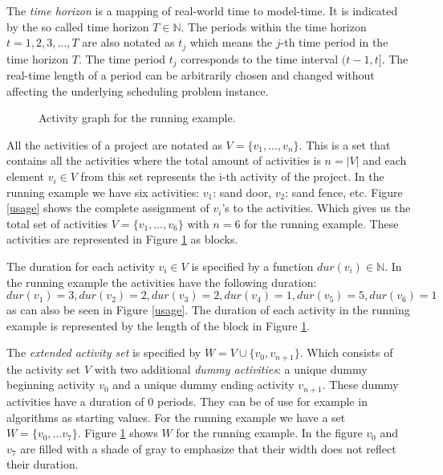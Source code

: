 \documentclass{article}
\theoremstyle{definition}
\newcommand{\inputtikz}[1]{}
\newcommand{\dur}[1]{\ensuremath{dur(v_{#1})}} %
\begin{document}
The \emph{time horizon} is a mapping of real-world time to model-time. It is indicated by the so called time horizon $T \in \mathbb{N}$.
The periods within the time horizon $t=1,2,3,\ldots,T$ are also notated as $t_j$ which means the $j$-th time period in the time horizon $T$. 
The time period $t_j$ corresponds to the time interval $(t-1,t]$. 
The real-time length of a period can be arbitrarily chosen and changed without affecting the underlying scheduling problem instance. 

\begin{figure}[ht]
	\centering
	\inputtikz{activity_graph}
	\caption{Activity graph for the running example.}
	\label{fig:activity_graph}
\end{figure}

All the activities of a project are notated as $V = \{v_1, \ldots, v_n\}$.
This is a set that contains all the activities where the total amount of activities is $n = |V|$ and each element $v_i \in V$ from this set represents the i-th activity of the project.
In the running example we have six activities: $v_1$: sand door, $v_2$: sand fence, etc. Figure \ref{usage} shows the complete assignment of $v_i$'s to the activities. 
Which gives us the total set of activities $V = \{v_1, \ldots, v_6\}$ with $n = 6$ for the running example.
These activities are represented in Figure \ref{fig:activity_graph} as blocks.

The duration for each activity $v_i \in V$ is specified by a function $\dur{i} \in \mathbb{N}$.
In the running example the activities have the following duration: $\dur{1} = 3, \dur{2} = 2, \dur{3} = 2, \dur{4} = 1, \dur{5} = 5, \dur{6} = 1$ as can also be seen in Figure \ref{usage}. 
The duration of each activity in the running example is represented by the length of the block in Figure \ref{fig:activity_graph}.

The \emph{extended activity set} is specified by $W = V \cup \{v_0, v_{n+1}\}$.
Which consists of the activity set $V$ with two additional \emph{dummy activities}: a unique dummy beginning activity $v_0$ and a unique dummy ending activity $v_{n+1}$. 
These dummy activities have a duration of $0$ periods. 
They can be of use for example in algorithms as starting values. 
For the running example we have a set $W = \{v_0, \ldots v_7\}$.
Figure \ref{fig:activity_graph} shows $W$ for the running example.
In the figure $v_0$ and $v_7$ are filled with a shade of gray to emphasize that their width does not reflect their duration. 
\end{document}
